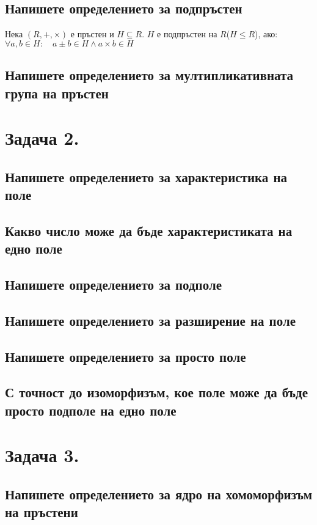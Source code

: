 \documentclass[10pt]{article}
\begin{document}
\subsection*{Напишете определението за подпръстен}
Нека $(R, +, \times)$ е пръстен и $H \subseteq R$. $H$ е подпръстен на $R$($H \leq R$), ако:\\
$\forall a, b \in H: \quad a \pm b \in H \land a \times b \in H$

\subsection*{Напишете определението за мултипликативната група на пръстен}

\section*{Задача 2.}

\subsection*{Напишете определението за характеристика на поле}
\subsection*{Какво число може да бъде характеристиката на едно поле}
\subsection*{Напишете определението за подполе}
\subsection*{Напишете определението за разширение на поле}
\subsection*{Напишете определението за просто поле}
\subsection*{С точност до изоморфизъм, кое поле може да бъде просто подполе на едно поле}

\section*{Задача 3.}

\subsection*{Напишете определението за ядро на хомоморфизъм на пръстени}
\end{document}
